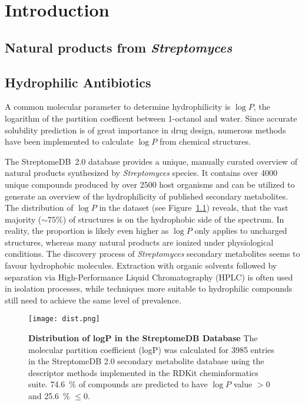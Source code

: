 \chapter{Introduction}

\section{Natural products from \textit{Streptomyces}} %
\label{sec:natural_products_from_it}


\section{Hydrophilic Antibiotics} %
\label{sec:hydrophilic_antibiotics}

A common molecular parameter to determine hydrophilicity is $\log P$, the logarithm of the partition coefficent between 1-octanol and water\autocite{Leo1971}.
Since accurate solubility prediction is of great importance in drug design, numerous methods have been implemented to calculate $\log P$ from chemical structures.\autocite{Eros2002,VandeWaterbeemd1996,Mannhold2009}

The StreptomeDB~2.0 database provides a unique, manually curated overview of natural products synthesized by \emph{Streptomyces} species.\autocite{Klementz2016}
It contains over 4000 unique compounds produced by over 2500 host organisms and can be utilized to generate an overview of the hydrophilicity of published secondary metabolites.
The distribution of $\log P$ in the dataset (see Figure~\ref{fig:logp_dist}) reveals, that the vast majority ($\sim 75\%$) of structures is on the hydrophobic side of the spectrum.
In reality, the proportion is likely even higher as $\log P$ only applies to uncharged structures, whereas many natural products are ionized under physiological conditions.
The discovery process of \emph{Streptomyces} secondary metabolites seems to favour hydrophobic molecules.
Extraction with organic solvents followed by separation via High-Performance Liquid Chromatography (HPLC) is often used in isolation processes, while techniques more suitable to hydrophilic compounds still need to achieve the same level of prevalence.\autocite{Sticher2008}

\begin{figure}[htbp]
	\centering
	\texttt{[image: dist.png]}
	\caption[Distribution of logP in the StreptomeDB Database]{%
		\textbf{Distribution of logP in the StreptomeDB Database}
		The molecular partition coefficient (logP) was calculated for 3985 entries in the StreptomeDB 2.0 secondary metabolite database\autocite{Klementz2016} using the descriptor methods implemented in the RDKit cheminformatics suite\autocite{Wildman1999}.
		74.6~\%  of compounds are predicted to have $\log P$ value $>0$ and 25.6~\% $\leq0$.
	}
	\label{fig:logp_dist}
\end{figure}



